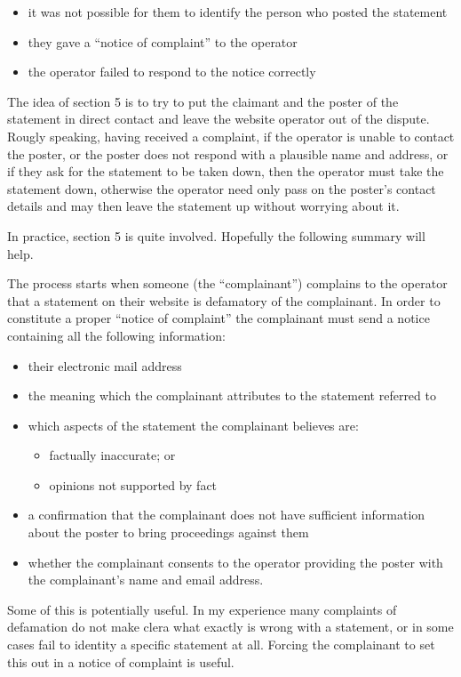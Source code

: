 \documentclass[]{article}
\begin{document}
\begin{itemize}
\item it was not possible for them to identify the person who posted the statement
\item they gave a ``notice of complaint'' to the operator
\item the operator failed to respond to the notice correctly
\end{itemize}

The idea of section 5 is to try to put the claimant and the poster of the statement in direct contact and leave the website operator out of the dispute. Rougly speaking, having received a complaint, if the operator is unable to contact the poster, or the poster does not respond with a plausible name and address, or if they ask for the statement to be taken down, then the operator must take the statement down, otherwise the operator need only pass on the poster's contact details and may then leave the statement up without worrying about it.

In practice, section 5 is quite involved. Hopefully the following summary will help.

The process starts when someone (the ``complainant'') complains to the operator that a statement on their website is defamatory of the complainant. In order to constitute a proper ``notice of complaint'' the complainant must send a notice containing all the following information:

\begin{itemize}
\item their electronic mail address
\item the meaning which the complainant attributes to the statement referred to
\item which aspects of the statement the complainant believes are:
  \begin{itemize}
  \item factually inaccurate; or
  \item opinions not supported by fact
  \end{itemize}
\item a confirmation that the complainant does not have sufficient information about the poster to bring proceedings against them
\item whether the complainant consents to the operator providing the poster with the complainant's name and email address.
\end{itemize}

Some of this is potentially useful. In my experience many complaints of defamation do not make clera what exactly is wrong with a statement, or in some cases fail to identity a specific statement at all. Forcing the complainant to set this out in a notice of complaint is useful.
\end{document}
